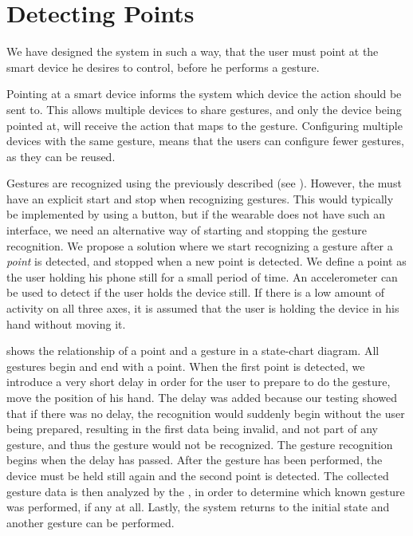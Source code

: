\section{Detecting Points}\label{sec:detecting-points}

We have designed the system in such a way, 
that the user must point at the smart device he desires to control, 
before he performs a gesture.

Pointing at a smart device informs the system which device the action should be sent to. 
This allows multiple devices to share gestures, 
and only the device being pointed at, 
will receive the action that maps to the gesture. 
Configuring multiple devices with the same gesture, 
means that the users can configure fewer gestures, 
as they can be reused.

Gestures are recognized using the previously described \threedollar (see ). 
However, the \threedollar must have an explicit start and stop when recognizing gestures. 
This would typically be implemented by using a button, 
but if the wearable does not have such an interface,
we need an alternative way of starting and stopping the gesture recognition.
We propose a solution where we start recognizing a gesture after a \emph{point} is detected,
and stopped when a new point is detected. 
We define a point as the user holding his phone still for a small period of time. 
An accelerometer can be used to detect if the user holds the device still. 
If there is a low amount of activity on all three axes, 
it is assumed that the user is holding the device in his hand without moving it.

 shows the relationship of a point and a gesture in a state-chart diagram. 
All gestures begin and end with a point. 
When the first point is detected, 
we introduce a very short delay in order for the user to prepare to do the gesture, 
\eg move the position of his hand. 
The delay was added because our testing showed that if there was no delay, 
the recognition would suddenly begin without the user being prepared, 
resulting in the first data being invalid, 
and not part of any gesture, 
and thus the gesture would not be recognized.
The gesture recognition begins when the delay has passed. 
After the gesture has been performed, 
the device must be held still again and the second point is detected. 
The collected gesture data is then analyzed by the \threedollar, 
in order to determine which known gesture was performed, if any at all. 
Lastly, the system returns to the initial state and another gesture can be performed.

